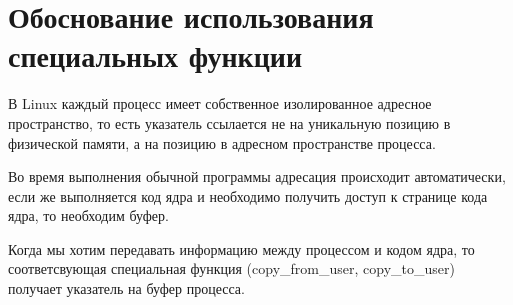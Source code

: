 \chapter{Обоснование использования специальных функции}

В Linux каждый процесс имеет собственное изолированное адресное пространство, то есть указатель ссылается не на уникальную позицию в физической памяти, а на позицию в адресном пространстве процесса.

Во время выполнения обычной программы адресация происходит автоматически, если же выполняется код ядра и необходимо получить доступ к странице кода ядра, то необходим буфер.

Когда мы хотим передавать информацию между процессом и кодом ядра, то соответсвующая специальная функция (copy\_from\_user, copy\_to\_user) получает указатель на буфер процесса.
